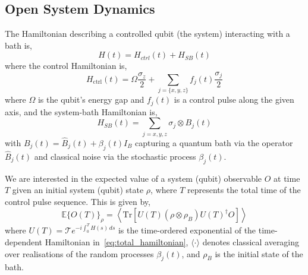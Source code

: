 \documentclass[12pt]{iopart}
\begin{document}
\subsection{Open System Dynamics \label{subsec:separating_control_dynamics_from_system_environment_interaction_dynamics}}
The Hamiltonian describing a controlled qubit (the system) interacting with a bath is,
\begin{equation}
    \label{eq:total_hamiltonian}
    H(t) = H_{ctrl}(t) + H_{SB}(t)
\end{equation}
where the control Hamiltonian is,
\begin{equation}
    \label{eq:control_hamiltonian}
    H_{\mathrm{ctrl}}(t)=\Omega \frac{\sigma_{z}}{2}+\sum_{j=\{x, y, z\}} f_{j}(t) \frac{\sigma_{j}}{2}
\end{equation}
where $\Omega$ is the qubit's energy gap and $f_j(t)$ is a control pulse along the given axis, and the system-bath Hamiltonian is,
\begin{equation}
    \label{eq:system_bath_hamiltonian}
    H_{SB}(t) = \sum_{j=x, y, z} \sigma_{j} \otimes B_{j}(t)
\end{equation}
with $B_{j}(t)=\hat{B}_{j}(t)+\beta_{j}(t) I_{B}$ capturing a quantum bath via the operator $\hat{B}_{j}(t)$ and classical noise via the stochastic process $\beta_{j}(t)$.

We are interested in the expected value of a system (qubit) observable $O$ at time $T$ given an initial system (qubit) state $\rho$, where $T$ represents the total time of the control pulse sequence. This is given by,
\begin{equation} \label{eq:initial_expectation}
    \mathbb{E}\{O(T)\}_{\rho}=\left\langle\mathrm{Tr}\left[U(T)\left(\rho \otimes \rho_{B}\right) U(T)^{\dagger} O\right]\right\rangle
\end{equation}
where $U(T)=\mathcal{T} e^{-i \int_{0}^{T} H(s) \, ds}$ is the time-ordered exponential of the time-dependent Hamiltonian in~\cref{eq:total_hamiltonian}, $\langle\cdot\rangle$ denotes classical averaging over realisations of the random processes $\beta_{j}(t)$, and $\rho_{B}$ is the initial state of the bath.
\end{document}
